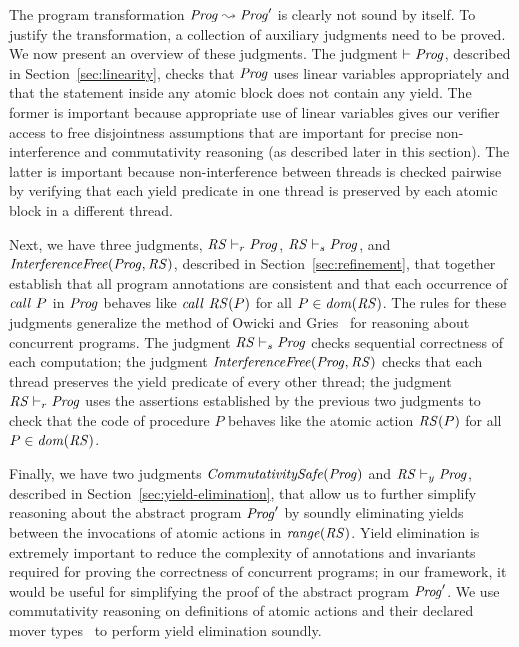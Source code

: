 The program transformation $\mathit{Prog} \leadsto \mathit{Prog}'$ is clearly not sound by itself.
To justify the transformation, a collection of auxiliary judgments need to be proved.
We now present an overview of these judgments.
The judgment $\vdash \mathit{Prog}$, described in Section~\ref{sec:linearity}, 
checks that $\mathit{Prog}$ uses linear variables appropriately and that the statement
inside any atomic block does not contain any yield.
The former is important because appropriate use of linear variables gives our verifier access to free disjointness
assumptions that are important for precise non-interference and commutativity reasoning (as described later in this section).
The latter is important because non-interference between threads is checked pairwise by verifying that each yield predicate
in one thread is preserved by each atomic block in a different thread.

Next, we have three judgments, $\mathit{RS} \vdash_r \mathit{Prog}$, $\mathit{RS} \vdash_s \mathit{Prog}$, and $\mathit{InterferenceFree}(\mathit{Prog}, \mathit{RS})$,
described in Section~\ref{sec:refinement},
that together establish that all program annotations are consistent and that 
each occurrence of $\mathit{call}\ P$ in $\mathit{Prog}$ behaves like $\mathit{call}\ \mathit{RS}(P)$ 
for all $P \in \mathit{dom}(\mathit{RS})$.
The rules for these judgments generalize the method of Owicki and Gries~\cite{OwickiG76} for reasoning about concurrent programs.
The judgment $\mathit{RS} \vdash_s \mathit{Prog}$ checks sequential correctness of each computation;
the judgment $\mathit{InterferenceFree}(\mathit{Prog}, \mathit{RS})$ checks that each thread preserves the
yield predicate of every other thread;
the judgment $\mathit{RS} \vdash_r \mathit{Prog}$ uses the assertions established by the previous two judgments to check that 
the code of procedure $P$ behaves like the atomic action $\mathit{RS}(P)$ for all $P\in\mathit{dom}(\mathit{RS})$.

Finally, we have two judgments $\mathit{CommutativitySafe}(\mathit{Prog})$ and $\mathit{RS} \vdash_y \mathit{Prog}$, 
described in Section~\ref{sec:yield-elimination}, that allow us to further simplify reasoning 
about the abstract program $\mathit{Prog}'$ by soundly eliminating yields between the invocations of atomic actions in $\mathit{range}(\mathit{RS})$.
Yield elimination is extremely important to reduce the complexity of annotations and invariants 
required for proving the correctness of concurrent programs;
in our framework, it would be useful for simplifying the proof of the abstract program $\mathit{Prog}'$.
We use commutativity reasoning on definitions of atomic actions and their declared mover types~\cite{FlanaganFLQ08,ElmasQT09}
to perform yield elimination soundly.

